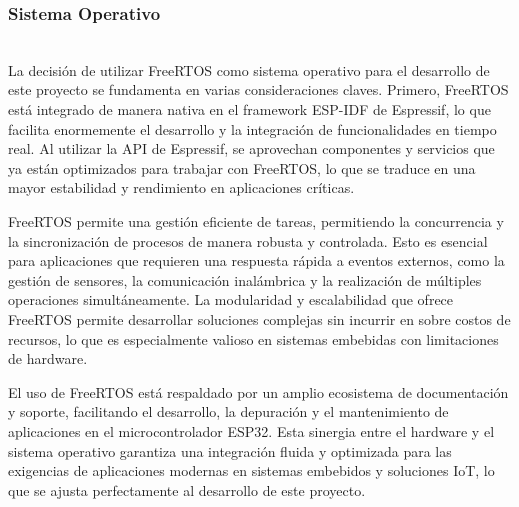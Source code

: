 \subsubsection{Sistema Operativo} \mbox{} \vspace{10pt} \\
La decisión de utilizar FreeRTOS como sistema operativo para el desarrollo de este proyecto se fundamenta en varias consideraciones claves. Primero, FreeRTOS está integrado de manera nativa en el framework ESP-IDF de Espressif, lo que facilita enormemente el desarrollo y la integración de funcionalidades en tiempo real. Al utilizar la API de Espressif, se aprovechan componentes y servicios que ya están optimizados para trabajar con FreeRTOS, lo que se traduce en una mayor estabilidad y rendimiento en aplicaciones críticas.

FreeRTOS permite una gestión eficiente de tareas, permitiendo la concurrencia y la sincronización de procesos de manera robusta y controlada. Esto es esencial para aplicaciones que requieren una respuesta rápida a eventos externos, como la gestión de sensores, la comunicación inalámbrica y la realización de múltiples operaciones simultáneamente. La modularidad y escalabilidad que ofrece FreeRTOS permite desarrollar soluciones complejas sin incurrir en sobre costos de recursos, lo que es especialmente valioso en sistemas embebidas con limitaciones de hardware.

El uso de FreeRTOS está respaldado por un amplio ecosistema de documentación y soporte, facilitando el desarrollo, la depuración y el mantenimiento de aplicaciones en el microcontrolador ESP32. Esta sinergia entre el hardware y el sistema operativo garantiza una integración fluida y optimizada para las exigencias de aplicaciones modernas en sistemas embebidos y soluciones IoT, lo que se ajusta perfectamente al desarrollo de este proyecto.